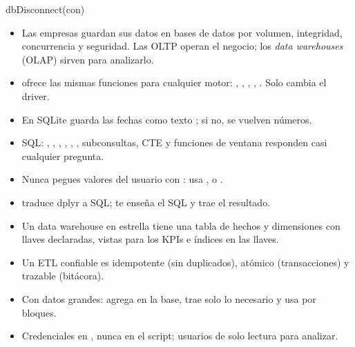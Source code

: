 \begin{rcode}
dbDisconnect(con)
\end{rcode}

\begin{resumen}
\begin{itemize}
  \item Las empresas guardan sus datos en bases de datos por volumen,
        integridad, concurrencia y seguridad. Las OLTP operan el negocio;
        los \emph{data warehouses} (OLAP) sirven para analizarlo.
  \item {} ofrece las mismas funciones para cualquier motor:
        , ,
        , ,
        . Solo cambia el driver.
  \item En SQLite guarda las fechas como texto ; si no,
        se vuelven números.
  \item SQL: , , ,
        , , , subconsultas,
        CTE y funciones de ventana responden casi cualquier pregunta.
  \item Nunca pegues valores del usuario con : usa
        ,  o .
  \item {} traduce dplyr a SQL;  te
        enseña el SQL y  trae el resultado.
  \item Un data warehouse en estrella tiene una tabla de hechos y
        dimensiones con llaves declaradas, vistas para los KPIs e índices
        en las llaves.
  \item Un ETL confiable es idempotente (sin duplicados), atómico
        (transacciones) y trazable (bitácora).
  \item Con datos grandes: agrega en la base, trae solo lo necesario y usa
         por bloques.
  \item Credenciales en , nunca en el script; usuarios de
        solo lectura para analizar.
\end{itemize}


\end{resumen}
